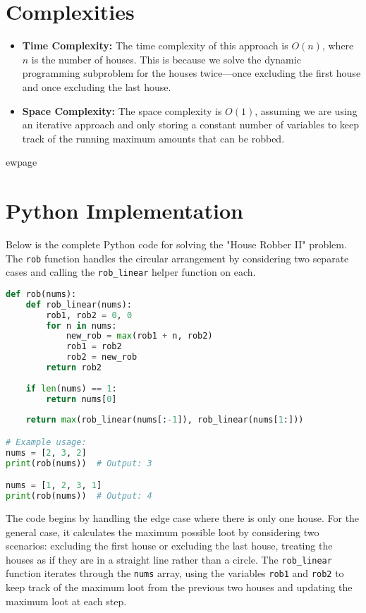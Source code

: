 \section*{Complexities}
\begin{itemize}
	\item \textbf{Time Complexity:} The time complexity of this approach is \(O(n)\), where \(n\) is the number of houses. This is because we solve the dynamic programming subproblem for the houses twice—once excluding the first house and once excluding the last house.
	\item \textbf{Space Complexity:} The space complexity is \(O(1)\), assuming we are using an iterative approach and only storing a constant number of variables to keep track of the running maximum amounts that can be robbed.
\end{itemize}


ewpage %
\section*{Python Implementation}


Below is the complete Python code for solving the "House Robber II" problem. The \texttt{rob} function handles the circular arrangement by considering two separate cases and calling the \texttt{rob\_linear} helper function on each.

\begin{fullwidth}
\begin{lstlisting}[language=Python]
def rob(nums):
    def rob_linear(nums):
        rob1, rob2 = 0, 0
        for n in nums:
            new_rob = max(rob1 + n, rob2)
            rob1 = rob2
            rob2 = new_rob
        return rob2
    
    if len(nums) == 1:
        return nums[0]
    
    return max(rob_linear(nums[:-1]), rob_linear(nums[1:]))

# Example usage:
nums = [2, 3, 2]
print(rob(nums))  # Output: 3

nums = [1, 2, 3, 1]
print(rob(nums))  # Output: 4
\end{lstlisting}

\end{fullwidth}


The code begins by handling the edge case where there is only one house. For the general case, it calculates the maximum possible loot by considering two scenarios: excluding the first house or excluding the last house, treating the houses as if they are in a straight line rather than a circle. The \texttt{rob\_linear} function iterates through the \texttt{nums} array, using the variables \texttt{rob1} and \texttt{rob2} to keep track of the maximum loot from the previous two houses and updating the maximum loot at each step.



